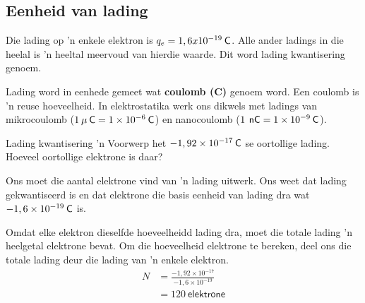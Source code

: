 \subsection{Eenheid van lading}

Die lading op 'n enkele elektron is ${q}_{e}=1,6x{10}^{-19}\phantom{\rule{2pt}{0ex}}\mathsf{C}$. Alle ander ladings in die heelal is 'n heeltal meervoud van hierdie waarde. Dit word lading kwantisering genoem.



Lading word in eenhede gemeet wat \textbf{coulomb (C)} genoem word. Een coulomb is 'n reuse hoeveelheid. In elektrostatika werk ons dikwels met ladings van mikrocoulomb ($1\phantom{\rule{2pt}{0ex}}\mu \phantom{\rule{2pt}{0ex}}\mathsf{C}=1\ensuremath{\times}{10}^{-6}\phantom{\rule{2pt}{0ex}}\mathsf{C}$) en nanocoulomb ($1\phantom{\rule{2pt}{0ex}}\phantom{\rule{2pt}{0ex}}\mathsf{nC}=1\ensuremath{\times}{10}^{-9}\phantom{\rule{2pt}{0ex}}\mathsf{C}$). \par

  
\begin{wex}{Lading kwantisering}
{
'n Voorwerp het $-1,92\ensuremath{\times}{10}^{-17}\phantom{\rule{2pt}{0ex}}\mathsf{C}$ se oortollige lading. Hoeveel oortollige elektrone is daar?
}
{


Ons moet die aantal elektrone vind van 'n lading uitwerk. Ons weet dat lading gekwantiseerd is en dat elektrone die basis eenheid van lading dra wat $-1,6\ensuremath{\times}{10}^{-19}\phantom{\rule{2pt}{0ex}}\mathsf{C}$ is.



Omdat elke elektron dieselfde hoeveelheidd lading dra, moet die totale lading 'n heelgetal elektrone bevat. Om die hoeveelheid elektrone te bereken, deel ons die totale lading deur die lading van 'n enkele elektron.
\begin{align*}
N &= \frac{-1,92\ensuremath{\times}{10}^{-17}}{-1,6\ensuremath{\times}{10}^{-19}}\\ 
  &= 120~\mathsf{ elektrone}
\end{align*}
}
\end{wex}

